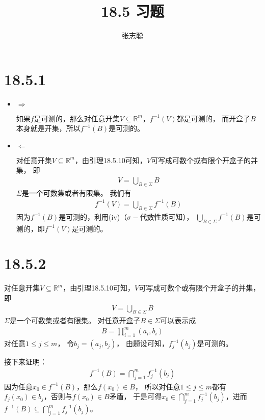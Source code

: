 \documentclass{article}
\begin{document}
\title{18.5 习题}
\author{张志聪}
\maketitle

\section*{18.5.1}

\begin{itemize}
  \item $\Rightarrow$

        如果$f$是可测的，那么对任意开集$V \subseteq \mathbb{R}^m$，$f^{-1}(V)$都是可测的，
        而开盒子$B$本身就是开集，所以$f^{-1}(B)$是可测的。

  \item $\Leftarrow$

        对任意开集$V \subseteq \mathbb{R}^m$，由引理18.5.10可知，$V$可写成可数个或有限个开盒子的并集，
        即
        \begin{align*}
          V = \bigcup_{B \in \Sigma} B
        \end{align*}
        $\Sigma$是一个可数集或者有限集。
        我们有
        \begin{align*}
          f^{-1}(V) = \bigcup_{B \in \Sigma} f^{-1}(B)
        \end{align*}
        因为$f^{-1}(B)$是可测的，利用(iv)（$\sigma-$代数性质可知），
        $\bigcup_{B \in \Sigma} f^{-1}(B)$是可测的，即$f^{-1}(V)$是可测的。

\end{itemize}

\section*{18.5.2}

对任意开集$V \subseteq \mathbb{R}^m$，由引理18.5.10可知，$V$可写成可数个或有限个开盒子的并集，
即
\begin{align*}
  V = \bigcup_{B \in \Sigma} B
\end{align*}
$\Sigma$是一个可数集或者有限集。
对任意开盒子$B \in \Sigma$可以表示成
\begin{align*}
  B = \prod\limits_{i=1}^m (a_i, b_i)
\end{align*}
对任意$1 \leq j \leq m$，
令$b_j = (a_j, b_j)$，
由题设可知，$f_j^{-1}(b_j)$是可测的。

接下来证明：
\begin{align*}
  f^{-1}(B) = \bigcap\limits_{j=1}^m f_j^{-1}(b_j)
\end{align*}
因为任意$x_0 \in f^{-1}(B)$，那么$f(x_0) \in B$，
所以对任意$1 \leq j \leq m$都有$f_j(x_0) \in b_j$，否则与$f(x_0) \in B$矛盾，
于是可得$x_0 \in \bigcap\limits_{j=1}^m f_j^{-1}(b_j)$，进而$f^{-1}(B) \subseteq \bigcap\limits_{j=1}^m f_j^{-1}(b_j)$。
\end{document}
